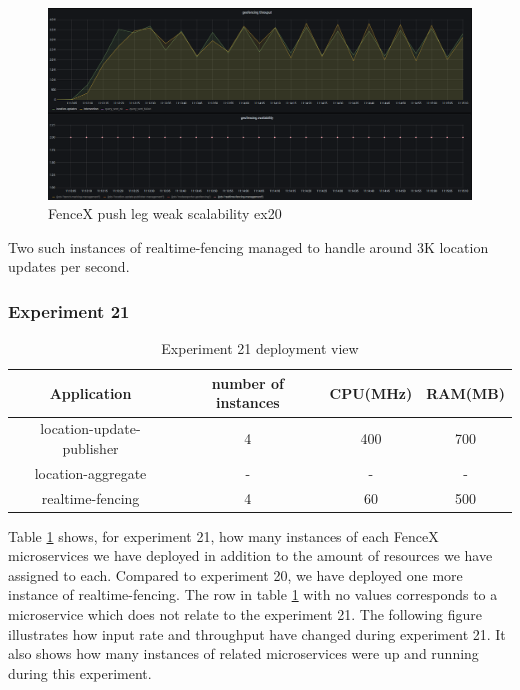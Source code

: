 \documentclass[a4]{report}
\begin{document}
    \begin{figure}[h!]
        \centering
        \caption{FenceX push leg weak scalability ex20}
        \label{fig:ex20}
        \includegraphics[width=\linewidth, scale=2]{images/evaluation/ex20-benchmarking-ongoing-1per10sec.png}
    \end{figure}

    Two such instances of realtime-fencing managed to handle around 3K location updates per second.

    \clearpage

    \subsubsection{Experiment 21}
    \begin{table}[h!]
        \centering
        \begin{tabular}{|c|c|c|c|}
            \hline
            Application               & number of instances & CPU(MHz) & RAM(MB) \\
            \hline
            location-update-publisher & 4                   & 400      & 700     \\
            location-aggregate        & -                   & -        & -       \\
            realtime-fencing          & 4                   & 60       & 500     \\
            \hline
        \end{tabular}
        \caption{Experiment 21 deployment view}
        \label{table:ex21-dv}
    \end{table}

    Table \ref{table:ex21-dv} shows, for experiment 21, how many instances of each FenceX microservices we have
    deployed in addition to the amount of resources we have assigned to each.
    Compared to experiment 20, we have deployed one more instance of realtime-fencing.
    The row in table \ref{table:ex21-dv} with no values corresponds to a microservice which does not relate to the
    experiment 21.
    The following figure illustrates how input rate and throughput have changed during experiment 21.
    It also shows how many instances of related microservices were up and running during this experiment.
\end{document}
